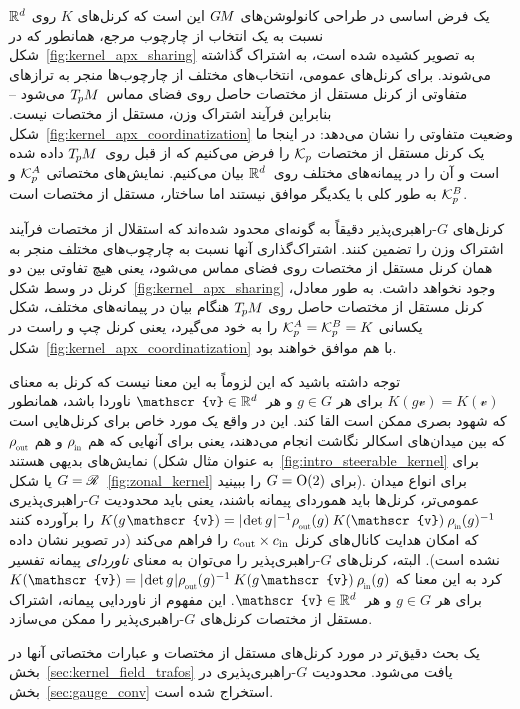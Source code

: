 یک فرض اساسی در طراحی کانولوشن‌های $G\mkern-1.4muM$ این است که کرنل‌های $K$ روی $\mathbb{R}^d$ نسبت به یک انتخاب از چارچوب مرجع، همانطور که در شکل~\ref{fig:kernel_apx_sharing} به تصویر کشیده شده است، به اشتراک گذاشته می‌شوند.
برای کرنل‌های عمومی، انتخاب‌های مختلف از چارچوب‌ها منجر به ترازهای متفاوتی از کرنل مستقل از مختصات حاصل روی فضای مماس~$T_{\mkern-1.5mu p}\mkern-.5muM$ می‌شود
-- بنابراین فرآیند اشتراک وزن، مستقل از مختصات نیست.
شکل~\ref{fig:kernel_apx_coordinatization} وضعیت متفاوتی را نشان می‌دهد:
در اینجا ما یک کرنل مستقل از مختصات $\mathcal{K}_p$ را فرض می‌کنیم که از قبل روی~$T_{\mkern-1.5mu p}\mkern-.5muM$ داده شده است و آن را در پیمانه‌های مختلف روی~$\mathbb{R}^d$ بیان می‌کنیم.
نمایش‌های مختصاتی $\mathcal{K}_p^A$ و $\mathcal{K}_p^B$ به طور کلی با یکدیگر موافق نیستند اما ساختار، مستقل از مختصات است.


کرنل‌های $G$-راهبری‌پذیر دقیقاً به گونه‌ای محدود شده‌اند که استقلال از مختصات فرآیند اشتراک وزن را تضمین کنند.
اشتراک‌گذاری آنها نسبت به چارچوب‌های مختلف منجر به همان کرنل مستقل از مختصات روی فضای مماس می‌شود،
یعنی هیچ تفاوتی بین دو کرنل در وسط شکل~\ref{fig:kernel_apx_sharing} وجود نخواهد داشت.
به طور معادل، کرنل مستقل از مختصات حاصل روی $T_{\mkern-1.5mu p}\mkern-.5muM$ هنگام بیان در پیمانه‌های مختلف، شکل یکسانی $\mathcal{K}_p^A = \mathcal{K}_p^B = K$ را به خود می‌گیرد،
یعنی کرنل چپ و راست در شکل~\ref{fig:kernel_apx_coordinatization} با هم موافق خواهند بود.


توجه داشته باشید که این لزوماً به این معنا نیست که کرنل به معنای $K(g\mathscr{v}) = K(\mathscr{v})$ برای هر $g\in G$ و هر~$\mathscr{v}\in\R^d$ ناوردا باشد، همانطور که شهود بصری ممکن است القا کند.
این در واقع یک مورد خاص برای کرنل‌هایی است که بین میدان‌های اسکالر نگاشت انجام می‌دهند، یعنی برای آنهایی که هم $\rhoin$ و هم $\rhoout$ نمایش‌های بدیهی هستند (به عنوان مثال شکل~\ref{fig:intro_steerable_kernel} برای $G=\mathscr{R}$ یا شکل~\ref{fig:zonal_kernel} برای $G=\operatorname{O}(2)$ را ببینید).
برای انواع میدان عمومی‌تر، کرنل‌ها باید هموردای پیمانه باشند، یعنی باید محدودیت $G$-راهبری‌پذیری
$K(g\mkern1.5mu \mathscr{v}) = \detg^{-1} \rhoout(g)\: K(\mathscr{v})\: \rhoin(g)^{-1}$
را برآورده کنند که امکان هدایت کانال‌های کرنل ${{c_\textup{out}}\times{c_\textup{in}}}$ را فراهم می‌کند (در تصویر نشان داده نشده است).
البته، کرنل‌های $G$-راهبری‌پذیر را می‌توان به معنای \emph{ناوردای} پیمانه تفسیر کرد به این معنا که
$K(\mathscr{v}) = \detg \rhoout(g)^{-1}\: K(g\mkern1.5mu \mathscr{v})\: \rhoin(g)$
برای هر $g\in G$ و هر~$\mathscr{v}\in\R^d$.
این مفهوم از ناوردایی پیمانه، اشتراک مستقل از مختصات کرنل‌های $G$-راهبری‌پذیر را ممکن می‌سازد.


یک بحث دقیق‌تر در مورد کرنل‌های مستقل از مختصات و عبارات مختصاتی آنها در بخش~\ref{sec:kernel_field_trafos} یافت می‌شود.
محدودیت $G$-راهبری‌پذیری در بخش~\ref{sec:gauge_conv} استخراج شده است.